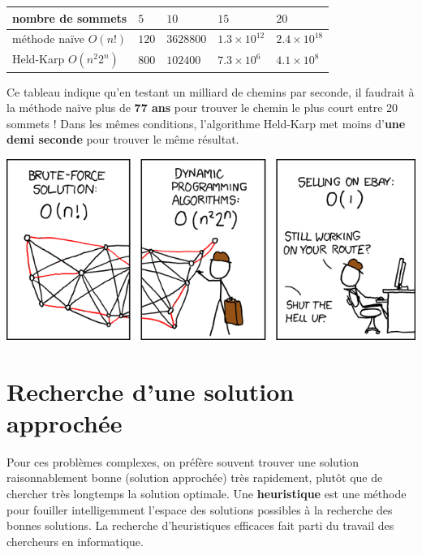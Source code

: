 \documentclass[a5paper,pagesize,DIV=14]{scrbook}
\begin{document}
\begin{center}
  \begin{tabular}{|l|llll|}
    \hline
    nombre de sommets       & $5$   & $10$      & $15$            & $20$ \\
    \hline
    méthode naïve $O(n!)$   & $120$ & $3628800$ & $1.3 \times 10^{12}$ & $2.4 \times 10^{18}$ \\
    Held-Karp $O(n^{2}2^n)$ & $800$ & $102400$  & $7.3 \times 10^6$       & $4.1 \times 10^8$ \\
    \hline
  \end{tabular} 
\end{center}

Ce tableau indique qu'en testant un milliard de chemins par seconde, il faudrait à la méthode naïve plus de \textbf{77 ans} pour trouver le chemin le plus court entre 20 sommets ! Dans les mêmes conditions, l'algorithme Held-Karp met moins d'\textbf{une demi seconde} pour trouver le même résultat.

  \begin{center}
    \includegraphics[width=\linewidth]{img/tsp_xkcd.png}
    \label{img:tsp_xkcd}
  \end{center}

\section*{Recherche d'une solution approchée}

Pour ces problèmes complexes, on préfère souvent trouver une solution raisonnablement bonne (solution approchée) très rapidement, plutôt que de chercher très longtemps la solution optimale. Une \textbf{heuristique} est une méthode pour fouiller intelligemment l'espace des solutions possibles à la recherche des bonnes solutions. La recherche d'heuristiques efficaces fait parti du travail des chercheurs en informatique.
\end{document}
